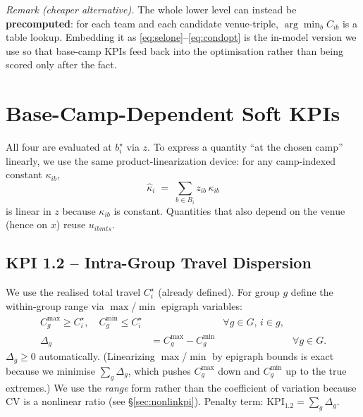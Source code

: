 \documentclass[12pt, letterpaper]{article}
\begin{document}
\medskip
\emph{Remark (cheaper alternative).} The whole lower level can instead be
\textbf{precomputed}: for each team and each candidate venue-triple,
$\arg\min_b C_{ib}$ is a table lookup. Embedding it as
\eqref{eq:selone}--\eqref{eq:condopt} is the in-model version we use so that
base-camp KPIs feed back into the optimisation rather than being scored
only after the fact.

\section{Base-Camp-Dependent Soft KPIs}
\label{sec:bc-kpi}

All four are evaluated at $b_i^\star$ via $z$. To express a quantity ``at
the chosen camp'' linearly, we use the same product-linearization device:
for any camp-indexed constant $\kappa_{ib}$,
\begin{equation}
\widehat{\kappa}_i \;=\; \sum_{b\in B_i} z_{ib}\,\kappa_{ib}
\label{eq:atchosen}
\end{equation}
is linear in $z$ because $\kappa_{ib}$ is constant. Quantities that also
depend on the venue (hence on $x$) reuse $u_{ibmts}$.

\subsection{KPI 1.2 -- Intra-Group Travel Dispersion}
We use the realised total travel $C_i^\star$ (already defined). For group
$g$ define the within-group range via $\max$/$\min$ epigraph variables:
\begin{align}
C^{\max}_g \ge C_i^\star,\quad
C^{\min}_g \le C_i^\star &&\forall g\in G,\,i\in g,\\
\Delta_g &= C^{\max}_g - C^{\min}_g &&\forall g\in G.
\end{align}
$\Delta_g\ge0$ automatically. (Linearizing $\max$/$\min$ by epigraph
bounds is exact because we minimise $\sum_g\Delta_g$, which pushes
$C^{\max}_g$ down and $C^{\min}_g$ up to the true extremes.) We use the
\emph{range} form rather than the coefficient of variation because CV is a
nonlinear ratio (see \S\ref{sec:nonlinkpi}). Penalty term:
$\mathrm{KPI}_{1.2}=\sum_{g} \Delta_g$.
\end{document}
